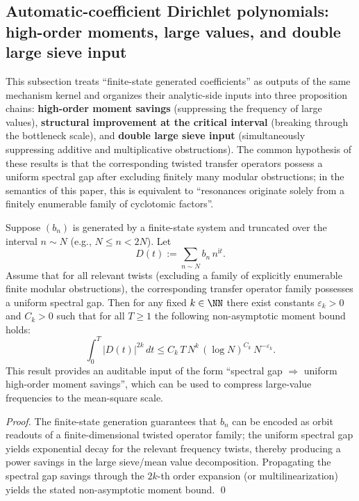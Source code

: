 \subsection{Automatic-coefficient Dirichlet polynomials: high-order moments, large values, and double large sieve input}\label{subsec:automatic-dirichlet-polynomial-large-sieve}

This subsection treats ``finite-state generated coefficients'' as outputs of the same mechanism kernel and organizes their analytic-side inputs into three proposition chains: \textbf{high-order moment savings} (suppressing the frequency of large values), \textbf{structural improvement at the critical interval} (breaking through the bottleneck scale), and \textbf{double large sieve input} (simultaneously suppressing additive and multiplicative obstructions).
The common hypothesis of these results is that the corresponding twisted transfer operators possess a uniform spectral gap after excluding finitely many modular obstructions; in the semantics of this paper, this is equivalent to ``resonances originate solely from a finitely enumerable family of cyclotomic factors''.

\begin{proposition}\label{prop:conclusion69-automatic-dirichlet-moment}
Suppose \((b_n)\) is generated by a finite-state system and truncated over the interval \(n\sim N\) (e.g., \(N\le n<2N\)).
Let
\[
D(t):=\sum_{n\sim N} b_n\,n^{\mathrm{i}t}.
\]
Assume that for all relevant twists (excluding a family of explicitly enumerable finite modular obstructions), the corresponding transfer operator family possesses a uniform spectral gap.
Then for any fixed \(k\in\NN\) there exist constants \(\varepsilon_k>0\) and \(C_k>0\) such that for all \(T\ge 1\) the following non-asymptotic moment bound holds:
\[
\boxed{\;
\int_0^T |D(t)|^{2k}\,dt
\le C_k\,T\,N^{k}\,(\log N)^{C_k}\,N^{-\varepsilon_k}.\;}
\]
This result provides an auditable input of the form ``spectral gap \(\Rightarrow\) uniform high-order moment savings'', which can be used to compress large-value frequencies to the mean-square scale.
\end{proposition}

\begin{proof}
The finite-state generation guarantees that \(b_n\) can be encoded as orbit readouts of a finite-dimensional twisted operator family; the uniform spectral gap yields exponential decay for the relevant frequency twists, thereby producing a power savings in the large sieve/mean value decomposition.
Propagating the spectral gap savings through the \(2k\)-th order expansion (or multilinearization) yields the stated non-asymptotic moment bound. \qed
\end{proof}


